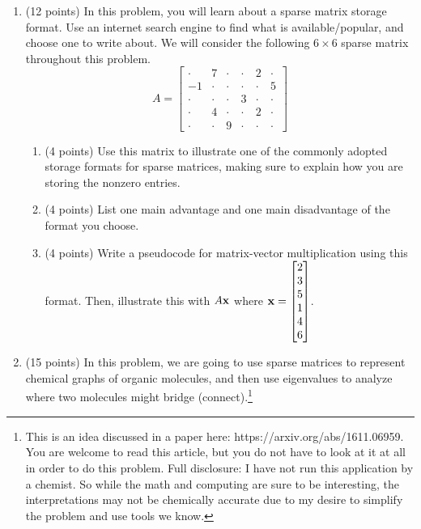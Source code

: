\documentclass[12point]{article}
\def\x{{\bf x}}
\begin{document}
\begin{enumerate}
\item (12 points) In this problem, you will learn about a sparse matrix storage format. Use an internet search engine to find what is available/popular, and choose one to write about. We will consider the following $6 \times 6$ sparse matrix throughout this problem.
$$A=\begin{bmatrix} \cdot & 7 & \cdot & \cdot & 2 & \cdot \\ -1 & \cdot & \cdot & \cdot & \cdot & 5 \\ \cdot & \cdot & \cdot & 3 & \cdot & \cdot \\ \cdot & 4 & \cdot & \cdot & 2 & \cdot \\ \cdot & \cdot & 9 & \cdot & \cdot & \cdot \end{bmatrix}$$
\begin{enumerate}
	\item (4 points) Use this matrix to illustrate one of the commonly adopted storage formats for sparse matrices, making sure to explain how you are storing the nonzero entries.
	\vfill
	\item (4 points) List one main advantage and one main disadvantage of the format you choose.
	\vfill
	\item (4 points) Write a pseudocode for matrix-vector multiplication using this format. Then, illustrate this with $A\x$ where $\x=\begin{bmatrix} 2 \\ 3 \\ 5 \\ 1  \\4 \\ 6 \end{bmatrix}$.
	\vfill
\end{enumerate}



\newpage


\item (15 points) In this problem, we are going to use sparse matrices to represent chemical graphs of organic molecules, and then use eigenvalues to analyze where two molecules might bridge (connect).\footnote{This is an idea discussed in a paper here: https://arxiv.org/abs/1611.06959. You are welcome to read this article, but you do not have to look at it at all in order to do this problem. Full disclosure: I have not run this application by a chemist. So while the math and computing are sure to be interesting, the interpretations may not be chemically accurate due to my desire to simplify the problem and use tools we know.} 



\end{enumerate}
\end{document}
